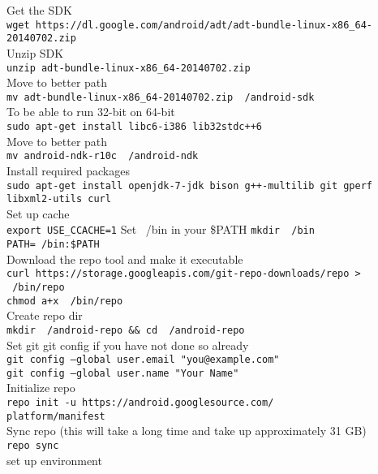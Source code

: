   Get the SDK\\
  \texttt{\justify \justify wget https://dl.google.com/android/adt/adt-bundle-linux-x86\_64-20140702.zip} \\
  Unzip SDK\\
  \texttt{\justify unzip adt-bundle-linux-x86\_64-20140702.zip} \\
  Move to better path\\
  \texttt{\justify mv adt-bundle-linux-x86\_64-20140702.zip ~/android-sdk} \\
  To be able to run 32-bit on 64-bit\\
  \texttt{\justify sudo apt-get install libc6-i386 lib32stdc++6} \\
  Move to better path\\
  \texttt{\justify mv android-ndk-r10c ~/android-ndk} \\
  Install required packages\\
  \texttt{\justify sudo apt-get install openjdk-7-jdk bison g++-multilib git gperf libxml2-utils curl} \\
  Set up cache\\
  \texttt{\justify export USE\_CCACHE=1}
  Set ~/bin in your \$PATH
  \texttt{\justify mkdir ~/bin} \\
  \texttt{\justify PATH=~/bin:\$PATH} \\
  Download the repo tool and make it executable\\
  \texttt{\justify curl https://storage.googleapis.com/git-repo-downloads/repo > ~/bin/repo} \\
  \texttt{\justify chmod a+x ~/bin/repo} \\
  Create repo dir\\
  \texttt{\justify mkdir ~/android-repo \&\& cd ~/android-repo} \\
  Set git git config if you have not done so already\\
  \texttt{\justify git config --global user.email "you@example.com"} \\
  \texttt{\justify git config --global user.name "Your Name"} \\
  Initialize repo\\
  \texttt{\justify repo init -u https://android.googlesource.com/\\platform/manifest} \\
  Sync repo (this will take a long time and take up approximately 31 GB)\\
  \texttt{\justify repo sync} \\
  set up environment\\
